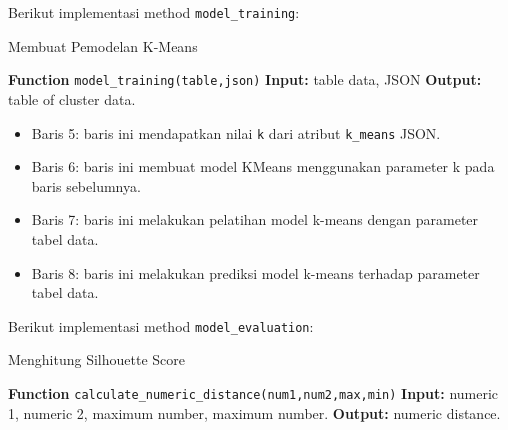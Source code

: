 \noindent Berikut implementasi method \texttt{model\_training}:

\begin{minipage}{.95\linewidth}
\begin{algorithm}[H]
  \caption{Membuat Pemodelan K-Means}\label{alg:6}
  \begin{algorithmic}[1]
  \State \textbf{Function} \texttt{model\_training(table,json)}
  \State \textbf{Input:} table data, JSON
  \State \textbf{Output:} table of cluster data.
  \\
  \end{algorithmic}
\end{algorithm}
\end{minipage}

\vspace{0.2cm}
\begin{itemize}
\item Baris 5: baris ini mendapatkan nilai \texttt{k} dari atribut \texttt{k\_means} JSON.
\item Baris 6: baris ini membuat model KMeans menggunakan parameter k pada baris sebelumnya.
\item Baris 7: baris ini melakukan pelatihan model k-means dengan parameter tabel data.
\item Baris 8: baris ini melakukan prediksi model k-means terhadap parameter tabel data.
\end{itemize}

\noindent Berikut implementasi method \texttt{model\_evaluation}:

\begin{minipage}{.8\linewidth}
\begin{algorithm}[H]
  \caption{Menghitung Silhouette Score}\label{alg:6}
  \begin{algorithmic}[1]
  \State \textbf{Function} \texttt{calculate\_numeric\_distance(num1,num2,max,min)}
  \State \textbf{Input:} numeric 1, numeric 2, maximum number, maximum number.
  \State \textbf{Output:} numeric distance.
  \\
  \end{algorithmic}
\end{algorithm}
\end{minipage}

